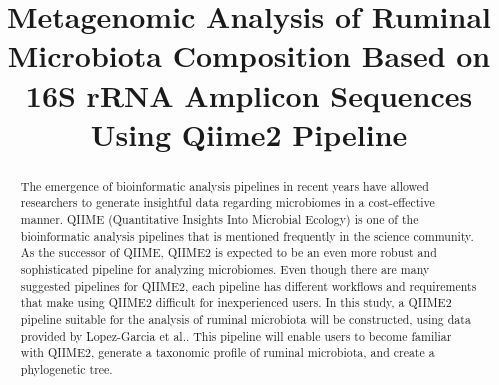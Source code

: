 \documentclass{singlecol-new}
\theoremstyle{TH}{
\newtheorem{lemma}{Lemma}
\newtheorem{theorem}[lemma]{Theorem}
\newtheorem{corrolary}[lemma]{Corrolary}
\newtheorem{conjecture}[lemma]{Conjecture}
\newtheorem{proposition}[lemma]{Proposition}
\newtheorem{claim}[lemma]{Claim}
\newtheorem{stheorem}[lemma]{Wrong Theorem}
\newtheorem{algorithm}{Algorithm}
}
\theoremstyle{THrm}{
\newtheorem{definition}{Definition}[section]
\newtheorem{question}{Question}[section]
\newtheorem{remark}{Remark}
\newtheorem{scheme}{Scheme}
}
\theoremstyle{THhit}{
\newtheorem{case}{Case}[section]
}
\begin{document}
%

\setcounter{page}{1}


%




\BottomCatch

\CLline

\subtitle{}

\title{Metagenomic Analysis of Ruminal Microbiota Composition Based on 16S rRNA Amplicon Sequences Using Qiime2 Pipeline}


%
%
%
%
%

%
%
\begin{abstract}
The emergence of bioinformatic analysis pipelines in recent years have allowed researchers to generate insightful data regarding microbiomes in a cost-effective manner. QIIME (Quantitative Insights Into Microbial Ecology) is one of the bioinformatic analysis pipelines that is mentioned frequently in the science community. As the successor of QIIME, QIIME2 is expected to be an even more robust and sophisticated pipeline for analyzing microbiomes. Even though there are many suggested pipelines for QIIME2, each pipeline has different workflows and requirements that make using QIIME2 difficult for inexperienced users. In this study, a QIIME2 pipeline suitable for the analysis of ruminal microbiota will be constructed, using data provided by Lopez-Garcia et al.. This pipeline will enable users to become familiar with QIIME2, generate a taxonomic profile of ruminal microbiota, and create a phylogenetic tree.

\end{abstract}
\end{document}
